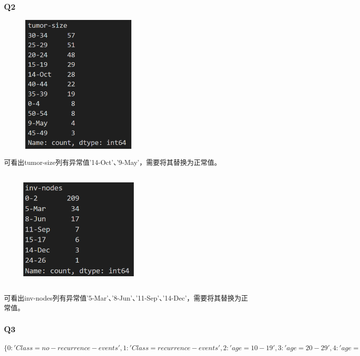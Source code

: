 \documentclass{ctexart}
\begin{document}
	\subsubsection{Q2}
	\begin{figure}[H]
		\centering 
		\includegraphics[height=7cm,width=6cm]{2.png}
		\end{figure}
		可看出tumor-size列有异常值'14-Oct'、'9-May'，需要将其替换为正常值。
		\begin{figure}[H]
			\centering 
			\includegraphics[height=6cm,width=6cm]{3.png}
			\end{figure}
可看出inv-nodes列有异常值'5-Mar'、'8-Jun'、'11-Sep'、'14-Dec'，需要将其替换为正常值。	
			\subsubsection{Q3}
		$\{0: 'Class=no-recurrence-events', 1: 'Class=recurrence-events', 2: 'age=10-19', 3: 'age=20-29', 4: 'age=30-39', 5: 'age=40-49', 6: 'age=50-59', 7: 'age=60-69', 8: 'age=70-79', 9: 'age=80-89', 10: 'age=90-99', 11: 'menopause=lt40', 12: 'menopause=ge40', 13: 'menopause=premeno', 14: 'tumor-size=0-4', 15: 'tumor-size=5-9', 16: 'tumor-size=10-14', 17: 'tumor-size=15-19', 18: 'tumor-size=20-24', 19: 'tumor-size=25-29', 20: 'tumor-size=30-34', 21: 'tumor-size=35-39', 22: 'tumor-size=40-44', 23: 'tumor-size=45-49', 24: 'tumor-size=50-54', 25: 'tumor-size=55-59', 26: 'inv-nodes=0-2', 27: 'inv-nodes=3-5', 28: 'inv-nodes=6-8', 29: 'inv-nodes=9-11', 30: 'inv-nodes=12-14', 31: 'inv-nodes=15-17', 32: 'inv-nodes=18-20', 33: 'inv-nodes=21-23', 34: 'inv-nodes=24-26', 35: 'inv-nodes=27-29', 36: 'inv-nodes=30-32', 37: 'inv-nodes=33-35', 38: 'inv-nodes=36-39', 39: 'node-caps=yes', 40: 'node-caps=no', 41: 'deg-malig=1', 42: 'deg-malig=2', 43: 'deg-malig=3', 44: 'breast=left', 45: 'breast=right', 46: 'breast-quad=left_up', 47: 'breast-quad=left_low', 48: 'breast-quad=right_up', 49: 'breast-quad=right_low', 50: 'breast-quad=central', 51: 'irradiat=yes', 52: 'irradiat=no'\}$
\end{document}
